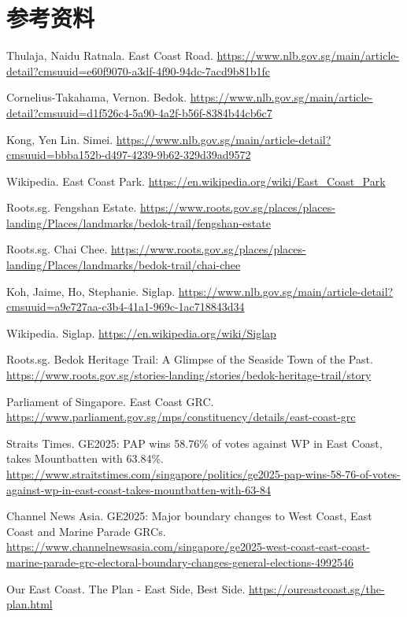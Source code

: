 \documentclass[11pt,a4paper,twoside,openany]{book}
\begin{document}
\section*{参考资料}
\begin{enumerate}[label={[\arabic*]},leftmargin=*,topsep=2pt,itemsep=1pt,parsep=0pt]
  \item Thulaja, Naidu Ratnala. East Coast Road. \url{https://www.nlb.gov.sg/main/article-detail?cmsuuid=e60f9070-a3df-4f90-94dc-7acd9b81b1fc}
  \item Cornelius-Takahama, Vernon. Bedok. \url{https://www.nlb.gov.sg/main/article-detail?cmsuuid=d1f526c4-5a90-4a2f-b56f-8384b44cb6c7}
  \item Kong, Yen Lin. Simei. \url{https://www.nlb.gov.sg/main/article-detail?cmsuuid=bbba152b-d497-4239-9b62-329d39ad9572}
  \item Wikipedia. East Coast Park. \url{https://en.wikipedia.org/wiki/East_Coast_Park}
  \item Roots.sg. Fengshan Estate. \url{https://www.roots.gov.sg/places/places-landing/Places/landmarks/bedok-trail/fengshan-estate}
  \item Roots.sg. Chai Chee. \url{https://www.roots.gov.sg/places/places-landing/Places/landmarks/bedok-trail/chai-chee}
  \item Koh, Jaime, Ho, Stephanie. Siglap. \url{https://www.nlb.gov.sg/main/article-detail?cmsuuid=a9e727aa-c3b4-41a1-969c-1ac718843d34}
  \item Wikipedia. Siglap. \url{https://en.wikipedia.org/wiki/Siglap}
  \item Roots.sg. Bedok Heritage Trail: A Glimpse of the Seaside Town of the Past. \url{https://www.roots.gov.sg/stories-landing/stories/bedok-heritage-trail/story}
  \item Parliament of Singapore. East Coast GRC. \url{https://www.parliament.gov.sg/mps/constituency/details/east-coast-grc}
  \item Straits Times. GE2025: PAP wins 58.76\% of votes against WP in East Coast, takes Mountbatten with 63.84\%. \url{https://www.straitstimes.com/singapore/politics/ge2025-pap-wins-58-76-of-votes-against-wp-in-east-coast-takes-mountbatten-with-63-84}
  \item Channel News Asia. GE2025: Major boundary changes to West Coast, East Coast and Marine Parade GRCs. \url{https://www.channelnewsasia.com/singapore/ge2025-west-coast-east-coast-marine-parade-grc-electoral-boundary-changes-general-elections-4992546}
  \item Our East Coast. The Plan - East Side, Best Side. \url{https://oureastcoast.sg/the-plan.html}
\end{enumerate}
\end{document}
